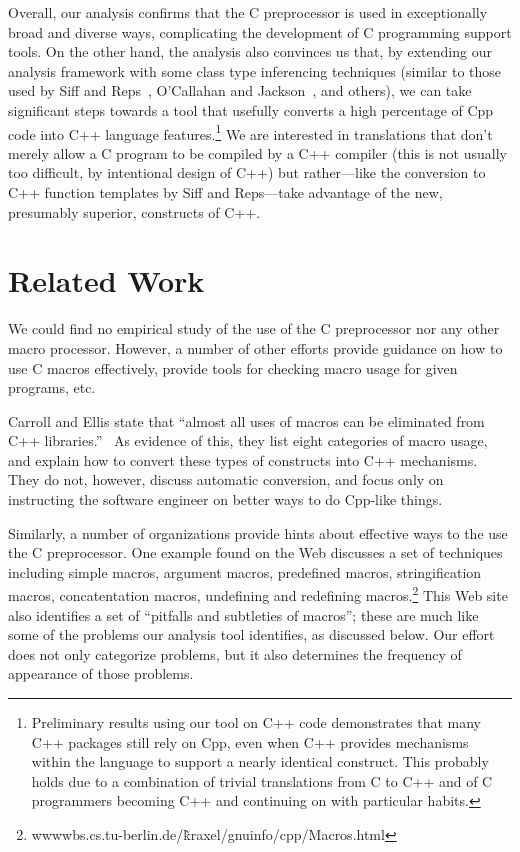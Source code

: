 Overall, our analysis confirms that the C preprocessor is used in
exceptionally broad and diverse ways, complicating the development of
C programming support tools.  On the other hand, the analysis also
convinces us that, by extending our analysis framework with some class
type inferencing techniques (similar to those used by Siff and
Reps~\cite{Siff-fse96}, O'Callahan and
Jackson~\cite{OCallahan-icse97}, and others), we can take significant
steps towards a tool that usefully converts a high percentage of Cpp
code into C++ language features.\footnote{Preliminary results using
our tool on C++ code demonstrates that many C++ packages still rely on
Cpp, even when C++ provides mechanisms within the language to support
a nearly identical construct.  This probably holds due to a
combination of trivial translations from C to C++ and of C programmers
becoming C++ and continuing on with particular habits.}  We are
interested in translations that don't merely allow a C program to be
compiled by a C++ compiler (this is not usually too difficult, by
intentional design of C++) but rather---like the conversion to C++
function templates by Siff and Reps---take advantage of the new,
presumably superior, constructs of C++.


\section{Related Work}\label{sec:related}

We could find no empirical study of the use of the C preprocessor nor
any other macro processor.  However, a number of other efforts provide
guidance on how to use C macros effectively, provide tools for
checking macro usage for given programs, etc.

Carroll and Ellis state that ``almost all uses of macros can be
eliminated from C++ libraries.''~\cite{Carroll95} As evidence of this,
they list eight categories of macro usage, and explain how to convert
these types of constructs into C++ mechanisms.  They do not, however,
discuss automatic conversion, and focus only on instructing the
software engineer on better ways to do Cpp-like things.

Similarly, a number of organizations provide hints about effective
ways to the use the C preprocessor.  One example found on the Web
discusses a set of techniques including simple macros, argument
macros, predefined macros, stringification macros, concatentation
macros, undefining and redefining
macros.\footnote{wwwwbs.cs.tu-berlin.de/\~kraxel/gnuinfo/cpp/Macros.html}
This Web site also identifies a set of ``pitfalls and subtleties of
macros''; these are much like some of the problems our analysis tool
identifies, as discussed below.  Our effort does not only categorize
problems, but it also determines the frequency of appearance of those
problems. 

